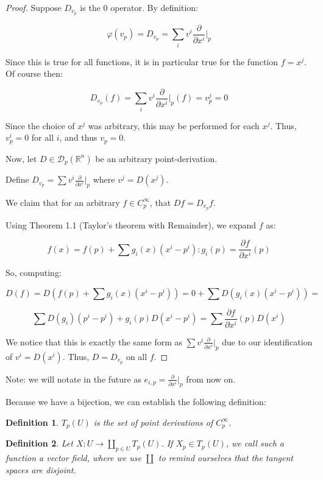 \documentclass[10pt]{article}
\newtheorem{definition}{Definition}[section]
\begin{document}
\begin{proof}

Suppose $D_{v_p}$ is the 0 operator. By definition:

$$ \varphi(v_p) = D_{v_p} = \sum_{i} v^i \frac{\partial}{\partial x^i} \bigg|_{p} $$

Since this is true for all functions, it is in particular true for the function $f = x^j$. Of course then:

$$ D_{v_p} (f) = \sum_{i} v^i \frac{\partial}{\partial x^i} \bigg|_{p} (f) = v^j_p = 0 $$

Since the choice of $x^j$ was arbitrary, this may be performed for each $x^j$. Thus, $v^i_p = 0$ for all $i$, and thus $v_p = 0$.

Now, let $D \in \mathcal{D}_p(\mathbb{R}^n)$ be an arbitrary point-derivation.

Define $D_{v_p} = \sum v^i \frac{\partial}{\partial x^i} \bigg|_p$ where $v^j =  D(x^j)$.

We claim that for an arbitrary $f \in C^\infty_p$, that $D f = D_{v_p} f$.

Using Theorem 1.1 (Taylor’s theorem with Remainder), we expand $f$ as:

$$ f(x) = f(p) + \sum g_i(x) (x^i - p^i) : g_i(p) =  \frac{\partial f}{\partial x^i}(p) $$

So, computing:

$$ D(f)  = D(f(p) + \sum g_i(x) (x^i - p^i)) = 0 + \sum D(g_i(x) (x^i - p^i)) = $$

$$\sum D(g_i) (p^i - p^i) + g_i(p) D(x^i - p^i) = \sum \frac{\partial f}{\partial x^i}(p) D(x^i) $$

We notice that this is exactly the same form as $\sum v^i \frac{\partial}{\partial x^i} \bigg|_p$ due to our identification of $v^i = D(x^i)$. Thus, $D = D_{v_p}$ on all $f$.
\end{proof}

Note: we will notate in the future as $e_{i,p} = \frac{\partial}{\partial x^i} \bigg|_p$ from now on. 

Because we have a bijection, we can establish the following definition:

\begin{definition}
$T_p(U)$ is the set of point derivations of $C^\infty_p$.
\end{definition}

\begin{definition}
Let $X: U \to \coprod_{p \in U} T_p (U)$. If $X_p \in T_p(U)$, we call such a function a vector field, where we use $\coprod$ to remind ourselves that the tangent spaces are disjoint.
\end{definition}
\end{document}
